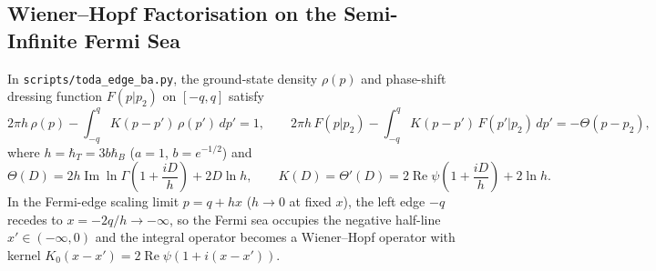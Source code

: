 \documentclass[11pt,a4paper]{article}
\newcommand{\script}[1]{\texttt{scripts/\allowbreak #1}}
\theoremstyle{remark}
\begin{document}
\subsection{Wiener--Hopf Factorisation on the Semi-Infinite Fermi Sea}
In \script{toda\_edge\_ba.py}, the ground-state density $\rho(p)$ and phase-shift dressing function
$F(p|p_2)$ on $[-q,q]$ satisfy
\begin{equation}
  2\pi h\,\rho(p) - \int_{-q}^q K(p-p')\,\rho(p')\,dp' = 1, \qquad
  2\pi h\,F(p|p_2) - \int_{-q}^q K(p-p')\,F(p'|p_2)\,dp' = -\Theta(p-p_2),
\end{equation}
where $h = \hbar_T = 3b\hbar_B$ ($a=1$, $b=e^{-1/2}$) and
\begin{equation}
  \Theta(D) = 2h\operatorname{Im}\ln\Gamma\!\left(1 + \frac{iD}{h}\right) + 2D\ln h, \qquad
  K(D) = \Theta'(D) = 2\operatorname{Re}\psi\!\left(1 + \frac{iD}{h}\right) + 2\ln h.
\end{equation}
In the Fermi-edge scaling limit $p = q + h x$ ($h\to 0$ at fixed $x$), the left edge $-q$ recedes
to $x = -2q/h \to -\infty$, so the Fermi sea occupies the negative half-line $x' \in (-\infty,0)$
and the integral operator becomes a Wiener--Hopf operator with kernel $K_0(x-x') = 2\operatorname{Re}\psi(1+i(x-x'))$.
\end{document}
